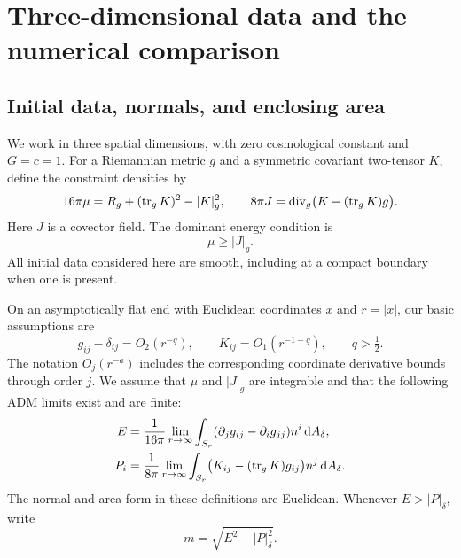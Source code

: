 \section{Three-dimensional data and the numerical comparison}\label{q3:intro:section}

\subsection{Initial data, normals, and enclosing area}

We work in three spatial dimensions, with zero cosmological constant and
\(G=c=1\). For a Riemannian metric \(g\) and a symmetric covariant
two-tensor \(K\), define the constraint densities by
\begin{equation}\label{q3:intro:constraints}
 16\pi\mu=R_g+(\operatorname{tr}_gK)^2-|K|_g^2,\qquad
 8\pi J=\operatorname{div}_g\bigl(K-(\operatorname{tr}_gK)g\bigr).
\end{equation}
Here \(J\) is a covector field. The dominant energy condition is
\begin{equation}\label{q3:intro:dec}
                         \mu\ge |J|_g.
\end{equation}
All initial data considered here are smooth, including at a compact
boundary when one is present.

On an asymptotically flat end with Euclidean coordinates \(x\) and
\(r=|x|\), our basic assumptions are
\begin{equation}\label{q3:intro:decay}
 g_{ij}-\delta_{ij}=O_2(r^{-q}),\qquad
 K_{ij}=O_1(r^{-1-q}),\qquad q>\tfrac12.
\end{equation}
The notation \(O_j(r^{-a})\) includes the corresponding coordinate
derivative bounds through order \(j\). We assume that \(\mu\) and
\(|J|_g\) are integrable and that the following ADM limits exist and are
finite:
\begin{align}
 E&=\frac1{16\pi}\lim_{r\to\infty}
   \int_{S_r}(\partial_jg_{ij}-\partial_i g_{jj})n^i
                    \,\mathrm d A_\delta,\label{q3:intro:energy}\\
 P_i&=\frac1{8\pi}\lim_{r\to\infty}
   \int_{S_r}\bigl(K_{ij}-(\operatorname{tr}_gK)g_{ij}\bigr)n^j
                    \,\mathrm d A_\delta.\label{q3:intro:momentum}
\end{align}
The normal and area form in these definitions are Euclidean. Whenever
\(E>|P|_\delta\), write
\begin{equation}\label{q3:intro:rest-mass}
                         m=\sqrt{E^2-|P|_\delta^2}.
\end{equation}

